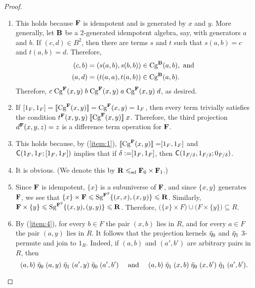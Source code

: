 \begin{proof}\
  \begin{enumerate}
  \item 
  This holds because $\mathbf{F}$ is idempotent and is generated by $x$ and $y$.
  More generally, let $\mathbf{B}$ be a 2-generated idempotent algebra, say, with
  generators $a$ and $b$.  If $(c,d) \in B^2$, then there are terms $s$ and $t$
  such that $s(a,b) = c$ and $t(a,b) = d$.  Therefore, 
  \begin{align*}
    (c,b) &= (s(a,b), s(b,b)) \in \operatorname{Cg}^{\mathbf{B}}(a,b), \text{ and }\\
    (a,d) &= (t(a,a), t(a,b)) \in \operatorname{Cg}^{\mathbf{B}}(a,b).
  \end{align*}
  Therefore, 
  $c \mathrel{\operatorname{Cg}^{\mathbf{F}}(x,y)} b\mathrel{\operatorname{Cg}^{\mathbf{F}}(x,y)} a \mathrel{\operatorname{Cg}^{\mathbf{F}}(x,y)} d$,
  as desired.

  \item If $[1_F,1_F] = \llbracket \operatorname{Cg}^{\mathbf{F}}(x,y) \rrbracket = \operatorname{Cg}^{\mathbf{F}}(x,y) = 1_F$, then every term
  trivially satisfies the condition
  $t^{\mathbf{F}}(x,y,y) \mathrel{\llbracket \operatorname{Cg}^{\mathbf{F}}(x,y) \rrbracket} x$.  Therefore, the third projection
  $d^{\mathbf{F}}(x,y,z) = z$ is a difference term operation for $\mathbf{F}$.

\item  This holds because, by (\ref{item:1}),
  $\llbracket \operatorname{Cg}^{\mathbf{F}}(x,y) \rrbracket = \mathrel{[1_F, 1_F]}$ and $\mathsf{C}(1_F, 1_F; \mathrel{[1_F, 1_F]})$
  implies that if
  $\delta := \mathrel{[1_F, 1_F]}$, then $\mathsf{C}(1_{F/\delta}, 1_{F/\delta}; 0_{F/\delta})$.
  


\item It is obvious. 
(We denote this by $\mathbf{R} \leqslant_{\mathrm{sd}} \mathbf{F}_0 \times \mathbf{F}_1$.)


\item
  Since $\mathbf{F}$ is idempotent, $\{x\}$ is a subuniverse of $\mathbf{F}$, and since
  $\{x, y\}$ generates $\mathbf{F}$, we see that
  $\{x\} \times \mathbf{F} \leqslant \operatorname{Sg}^{\mathbf{F}^2}\{(x,x), (x,y)\}\leqslant \mathbf{R}$.
  Similarly, $\mathbf{F}\times \{y\} \leqslant \operatorname{Sg}^{\mathbf{F}^2}\{(x,y), (y,y)\}\leqslant \mathbf{R}$.
  Therefore,
  $\bigl(\{x\} \times F\bigr) \cup \bigl(F \times \{y\}\bigr) \subseteq R$.


\item By (\ref{item:4}), for every $b \in F$ the pair $(x,b)$ lies in $R$, and for every
  $a\in F$ the pair $(a,y)$ lies in $R$.
  It follows that the projection kernels $\tilde{\eta}_0$ and $\tilde{\eta}_1$ 3-permute and
  join to $1_R$.
  Indeed, if $(a,b)$ and $(a',b')$ are arbitrary pairs in $R$, then
  \[ (a,b) \mathrel{\tilde{\eta}_0} (a,y) \mathrel{\tilde{\eta}_1} (a',y) \mathrel{\tilde{\eta}_0}
    (a',b') \quad \text{ and } \quad 
  (a,b) \mathrel{\tilde{\eta}_1} (x,b) \mathrel{\tilde{\eta}_0} (x,b') \mathrel{\tilde{\eta}_1} (a',b'). \]
  \end{enumerate}
\end{proof}

